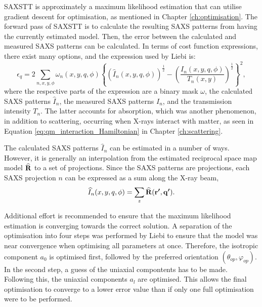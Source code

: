 SAXSTT is approximately a maximum likelihood estimation that can utilise gradient descent for optimisation, as mentioned in Chapter \ref{ch:optimisation}.
The forward pass of SAXSTT is to calculate the resulting SAXS patterns from having the currently estimated model.
Then, the error between the calculated and measured SAXS patterns can be calculated.
In terms of cost function expressions, there exist many options, and the expression used by Liebi \cite{liebi2018small} is:
\begin{equation}
    \epsilon_{q} = 2 \sum_{n, x, y, \phi} \omega_{n}(x,y,q,\phi) \left\{ \left( \widehat{I}_{n}(x,y,q,\phi) \right)^{\frac{1}{2}}  -  \left( \frac{ I_{n}(x,y,q,\phi) }{T_{n}(x,y)} \right)^{\frac{1}{2}} \right\}^{2},
\end{equation}
\noindent
where the respective parts of the expression are a binary mask $\omega$, the calculated SAXS patterns $\widehat{I}_{n}$, the measured SAXS patterns $I_{n}$, and the transmission intensity $T_{n}$.
The latter accounts for absorption, which was another phenomenon, in addition to scattering, occurring when X-rays interact with matter,
as seen in Equation \eqref{eq:qm_interaction_Hamiltonian} in Chapter \ref{ch:scattering}.

The calculated SAXS patterns $\widehat{I}_{n}$ can be estimated in a number of ways.
However, it is generally an interpolation from the estimated reciprocal space map model $\bm{\mathrm{\widehat{R}}}$ to a set of projections.
Since the SAXS patterns are projections, each SAXS projection $n$ can be expressed as a sum along the X-ray beam,
\begin{equation}\label{eq:SAXS_intensity}
    \widehat{I}_{n}(x,y,q,\phi) = \sum_{z} \bm{\widehat{\mathrm{R}}}(\bm{\mathrm{r'}}, \bm{\mathrm{q'}}).
\end{equation}

Additional effort is recommended to ensure that the maximum likelihood estimation is converging towards the correct solution.
A separation of the optimisation into four steps was performed by Liebi \cite{liebi2018small} to ensure that the model was near convergence when optimising all parameters at once.
Therefore, the isotropic component $a_{0}$ is optimised first, followed by the preferred orientation $(\theta_{op}, \varphi_{op})$. In the second step, a guess of the uniaxial compontents has to be made.
Following this, the uniaxial components $a_{l}$ are optimised.
This allows the final optimisation to converge to a lower error value than if only one full optimisation were to be performed.


